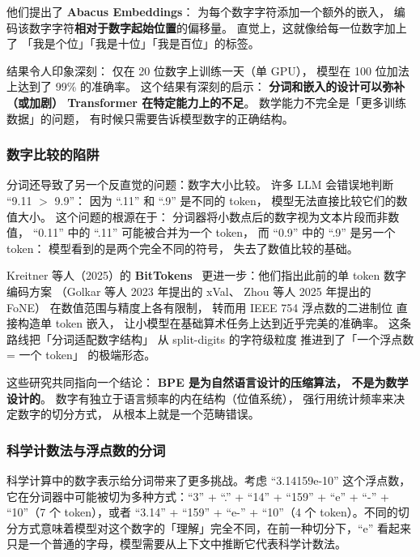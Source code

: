 他们提出了 \textbf{Abacus Embeddings}：
为每个数字字符添加一个额外的嵌入，
编码该数字字符\textbf{相对于数字起始位置}的偏移量。
直觉上，这就像给每一位数字加上了
「我是个位」「我是十位」「我是百位」的标签。

结果令人印象深刻：
仅在 20 位数字上训练一天（单 GPU），
模型在 100 位加法上达到了 99\% 的准确率。
这个结果有深刻的启示：
\textbf{分词和嵌入的设计可以弥补（或加剧）
Transformer 在特定能力上的不足}。
数学能力不完全是「更多训练数据」的问题，
有时候只需要告诉模型数字的正确结构。

\subsubsection{数字比较的陷阱}

分词还导致了另一个反直觉的问题：数字大小比较。
许多 LLM 会错误地判断 “9.11 $>$ 9.9”：
因为 “.11” 和 “.9” 是不同的 token，
模型无法直接比较它们的数值大小。
这个问题的根源在于：
分词器将小数点后的数字视为文本片段而非数值，
“0.11” 中的 “.11” 可能被合并为一个 token，
而 “0.9” 中的 “.9” 是另一个 token：
模型看到的是两个完全不同的符号，
失去了数值比较的基础。

Kreitner 等人（2025）的 \textbf{BitTokens}~\cite{kreitner2025bittokens}
更进一步：他们指出此前的单 token 数字编码方案
（Golkar 等人 2023 年提出的 xVal、
Zhou 等人 2025 年提出的 FoNE）
在数值范围与精度上各有限制，
转而用 IEEE 754 浮点数的二进制位
直接构造单 token 嵌入，
让小模型在基础算术任务上达到近乎完美的准确率。
这条路线把「分词适配数字结构」
从 split-digits 的字符级粒度
推进到了「一个浮点数 = 一个 token」
的极端形态。

这些研究共同指向一个结论：
\textbf{BPE 是为自然语言设计的压缩算法，
不是为数学设计的}。
数字有独立于语言频率的内在结构（位值系统），
强行用统计频率来决定数字的切分方式，
从根本上就是一个范畴错误。

\subsubsection{科学计数法与浮点数的分词}

科学计算中的数字表示给分词带来了更多挑战。考虑 “3.14159e-10” 这个浮点数，它在分词器中可能被切为多种方式：“3” + “.” + “14” + “159” + “e” + “-” + “10”（7 个 token），或者 “3.14” + “159” + “e-” + “10”（4 个 token）。不同的切分方式意味着模型对这个数字的「理解」完全不同，在前一种切分下，“e” 看起来只是一个普通的字母，模型需要从上下文中推断它代表科学计数法。

